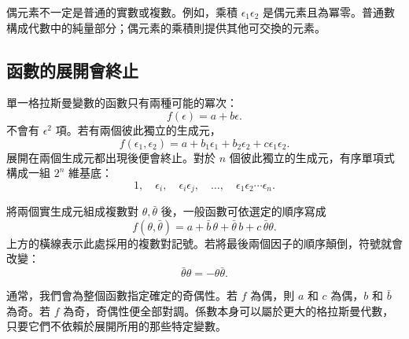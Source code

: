 偶元素不一定是普通的實數或複數。例如，乘積 \(\epsilon_1\epsilon_2\) 是偶元素且為冪零。普通數構成代數中的純量部分；偶元素的乘積則提供其他可交換的元素。

\begin{classroomqa}
\end{classroomqa}

\subsection{函數的展開會終止}

單一格拉斯曼變數的函數只有兩種可能的冪次：
\begin{equation}
f(\epsilon)=a+b\epsilon.
\end{equation}
不會有 \(\epsilon^2\) 項。若有兩個彼此獨立的生成元，
\begin{equation}
f(\epsilon_1,\epsilon_2)
=a+b_1\epsilon_1+b_2\epsilon_2+c\epsilon_1\epsilon_2.
\end{equation}
展開在兩個生成元都出現後便會終止。對於 \(n\) 個彼此獨立的生成元，有序單項式構成一組 \(2^n\) 維基底：
\begin{equation}
1,\quad
\epsilon_i,\quad
\epsilon_i\epsilon_j,\quad
\ldots,\quad
\epsilon_1\epsilon_2\cdots\epsilon_n.
\end{equation}

將兩個實生成元組成複數對 \(\theta,\bar\theta\) 後，一般函數可依選定的順序寫成
\begin{equation}
f(\theta,\bar\theta)
=a+\bar b\,\theta+\bar\theta\,b+c\,\bar\theta\theta.
\end{equation}
上方的橫線表示此處採用的複數對記號。若將最後兩個因子的順序顛倒，符號就會改變：
\begin{equation}
\bar\theta\theta=-\theta\bar\theta.
\end{equation}

通常，我們會為整個函數指定確定的奇偶性。若 \(f\) 為偶，則 \(a\) 和 \(c\) 為偶，\(b\) 和 \(\bar b\) 為奇。若 \(f\) 為奇，奇偶性便全部對調。係數本身可以屬於更大的格拉斯曼代數，只要它們不依賴於展開所用的那些特定變數。

\begin{classroomqa}
\end{classroomqa}

